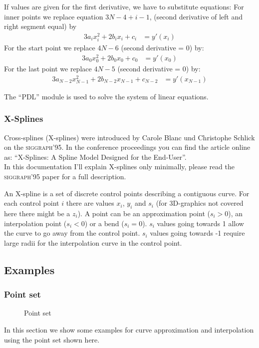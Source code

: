 \documentclass[origlongtable]{scrartcl}
\newcommand{\includepgfimage}[2]{%
\begin{figure}%
{\centering%
\caption{#2}\label{fig:#1}%
}%
\end{figure}%
}
\begin{document}
If values are given for the first derivative, we have to substitute
equations:
For inner points we replace equation
\(3N-4+i-1\),
(second derivative of left and right segment equal) by
\begin{align*}3a_ix_i^2+2b_ix_i+c_i&=y'(x_i)\end{align*}
For the start point we replace \(4N-6\)
(second derivative = 0)
by:
\begin{align*}3a_0x_0^2+2b_0x_0+c_0&=y'(x_0)\end{align*}
For the last point we replace \(4N-5\) (second derivative = 0)
by:
\begin{align*}3a_{N-2}x_{N-1}^2+2b_{N-2}x_{N-1}+c_{N-2}&=y'(x_{N-1})\end{align*}

The ``PDL'' module is used to solve the system of linear equations.
\clearpage
\subsubsection{X-Splines}
Cross-splines (X-splines) were introduced by Carole Blanc und Christophe Schlick
on the \textsc{siggraph}'95. In the conference proceedings you can find the
article online as:
``X-Splines: A Spline Model Designed for the End-User''.\\
In this documentation I'll explain X-splines only minimally, please
read the \textsc{siggraph}'95 paper for a full description.

An X-spline is a set of discrete control points describing a contiguous
curve. For each control point \(i\) there are values
\(x_i\), \(y_i\) and \(s_i\) (for 3D-graphics not covered here there
might be a \(z_i\)).
A point can be an approximation point (\(s_i>0\)), an interpolation
point (\(s_i<0\)) or a bend (\(s_i=0\)). \(s_i\) values going towards
1 allow the curve to go away from the control point.
\(s_i\) values going towards -1 require large radii for the interpolation
curve in the control point.
\clearpage
\subsection{Examples}
\subsubsection{Point set}
\includepgfimage{../examples/test016a}{Point set}
In this section we show some examples for curve approximation and
interpolation using the point set shown here.
\clearpage
\end{document}
